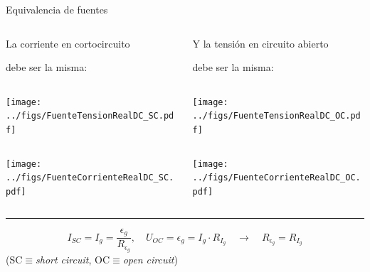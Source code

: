 \documentclass[aspectratio=169, xcolor={usenames,svgnames,dvipsnames}]{beamer}
\begin{document}

\begin{frame}{Equivalencia de fuentes}
    \vspace*{5mm}
    \begin{columns}

    \begin{column}{0.5\columnwidth}
    \centering 
    La \alert{corriente en cortocircuito} 
    
    debe ser la misma:
    
        \begin{column}{0.25\columnwidth}
            \texttt{[image: ../figs/FuenteTensionRealDC\_SC.pdf]}        
        \end{column}
        \begin{column}{0.25\columnwidth}
           \texttt{[image: ../figs/FuenteCorrienteRealDC\_SC.pdf]}           
        \end{column}       
        \hfill
    \end{column}    
    \vrule
    \begin{column}{0.5\columnwidth}
    \centering 
    Y la \alert{tensión en circuito abierto} 
    
    debe ser la misma:
    
        \begin{column}{0.25\columnwidth}
            \hspace*{6mm}\texttt{[image: ../figs/FuenteTensionRealDC\_OC.pdf]}        
        \end{column}
        \begin{column}{0.25\columnwidth}
           \texttt{[image: ../figs/FuenteCorrienteRealDC\_OC.pdf]}
        \end{column}
        \hfill
    \end{column}
    
    \end{columns}

    \vspace{4mm}
    \hrule
    \vspace{3mm}
    
    \[
        I_{SC}=I_g=\frac{\epsilon_g}{R_{\epsilon_g}} , \quad 
        U_{OC}=\epsilon_g=I_g \cdot R_{I_g} \quad \rightarrow \quad \boxed{R_{\epsilon_g} = R_{I_g}}
    \]
    \hspace*{29mm}(\small{SC$\equiv$\textit{short circuit}, \hspace*{4mm}OC$\equiv$\textit{open circuit}})

\end{frame}
\end{document}
